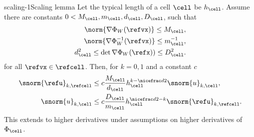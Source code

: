 \begin{Lemma*}{scaling-1}{Scaling lemma}
  Let the typical length of a cell $\cell$ be $h_\cell$. Assume there
  are constants $0 < M_\cell, m_\cell, d_\cell, D_\cell$, such that
  \begin{gather}
    \begin{split}
      \norm{\nabla\Phi_W(\refvx)} \le M_\cell,
      \\
      \norm{\nabla\Phi_W^{-1}(\refvx)} \le m_\cell^{-1} ,
      \\
      d^2_\cell \le \det \nabla\Phi_W(\refx)) \le D^2_\cell.      
    \end{split}
  \end{gather}
  for all $\refvx\in\refcell$. Then, for $k=0,1$ and a constant $c$
  \begin{gather}
    \begin{split}
      \snorm{\refu}_{k,\refcell}
      &\le c \frac{M_\cell}{d_\cell}  h_\cell^{k-\nicefrac d2}
      \snorm{u}_{k,\cell},\\
      \snorm{u}_{k,\cell}
      &\le c \frac{D_\cell}{m_\cell} h_\cell^{\nicefrac d2-k}
      \snorm{\refu}_{k,\refcell}.
    \end{split}
  \end{gather}
  This extends to higher derivatives under assumptions on higher
  derivatives of $\Phi_\cell$.
\end{Lemma*}

